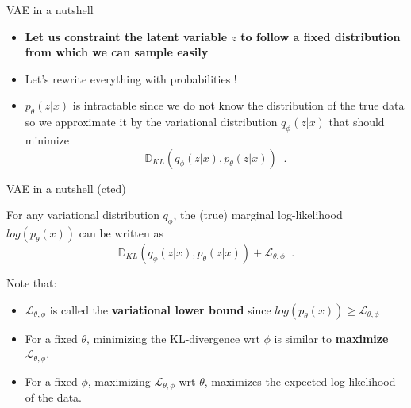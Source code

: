\documentclass{beamer}
\begin{document}
\begin{frame}{VAE in a nutshell}
    \begin{itemize}
        \item \textcolor{cGreen!80}{\textbf{Let us constraint the latent variable $z$ to follow a fixed distribution from which we can sample easily}}
        \item Let's rewrite everything with probabilities !
        \begin{figure}
        \centering
    \end{figure}
    \item $p_\theta(z|x)$ is intractable since we do not know the distribution of the true data so we approximate it by the \textcolor{cOrange}{variational distribution $q_\phi(z|x)$} that should minimize
    \[ \mathbb{D}_{KL}(q_\phi(z|x), p_\theta(z|x)) \;\;. \] 
    
    \end{itemize}
    
\end{frame}

\begin{frame}{VAE in a nutshell (cted)}
    \begin{lemma}
    For any variational distribution $q_\phi$, the (true) marginal log-likelihood $log(p_\theta(x))$ can be written as
        \[ \mathbb{D}_{KL}(q_\phi(z|x), p_\theta(z|x)) + \mathcal{L}_{\theta, \phi}\;\;. \]
    \end{lemma}

Note that:
    \begin{itemize}
        \item $\mathcal{L}_{\theta, \phi}$ is called the \textbf{variational lower bound} since $log(p_\theta(x)) \geq \mathcal{L}_{\theta, \phi}$
        \item For a fixed $\theta$, minimizing the KL-divergence wrt $\phi$ is similar to \textbf{maximize $\mathcal{L}_{\theta, \phi}$}.
        \item For a fixed $\phi$, maximizing $\mathcal{L}_{\theta, \phi}$ wrt $\theta$, maximizes the expected log-likelihood of the data.
    \end{itemize}
\end{frame}
\end{document}
